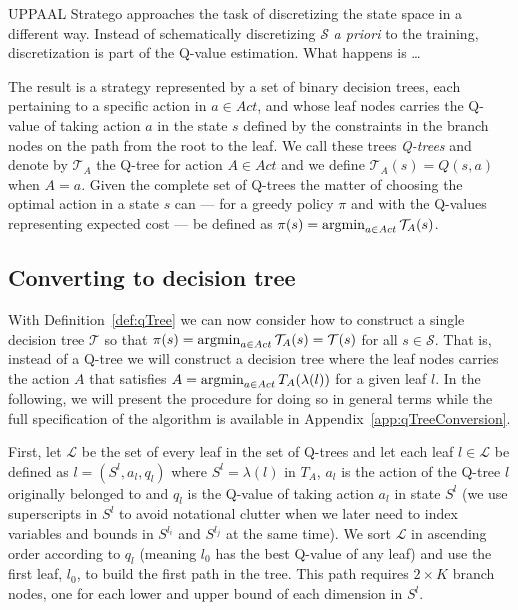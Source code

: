 UPPAAL Stratego approaches the task of discretizing the state space in a
different way. Instead of schematically discretizing $\mathcal{S}$ \textit{a
priori} to the training, discretization is part of the Q-value estimation. What
happens is \ldots{}

The result is a strategy represented by a set of binary decision trees, each
pertaining to a specific action in $a \in Act$, and whose leaf nodes carries the
Q-value of taking action $a$ in the state $s$ defined by the constraints in the
branch nodes on the path from the root to the leaf. We call these trees
\textit{Q-trees} and denote by $\mathcal{T}_A$ the Q-tree for action $A \in Act$
and we define $\mathcal{T}_A(s) = Q(s,a)$ when $A=a$. Given the complete set of Q-trees
the matter of choosing the optimal action in a state $s$ can --- for a greedy
policy $\pi$ and with the Q-values representing expected cost --- be defined as
$\pi(s) = \operatorname*{argmin}_{a\in Act} \mathcal{T}_A(s)$.


\subsection{Converting to decision tree}%
\label{subsec:convertQTtoDT}

With Definition~\ref{def:qTree} we can now consider how to construct a single
decision tree $\mathcal{T}$ so that $\pi(s) = \operatorname*{argmin}_{a \in Act}
\mathcal{T}_A(s) = \mathcal{T}(s)$ for all $s \in \mathcal{S}$. That is, instead
of a Q-tree we will construct a decision tree where the leaf nodes carries the
action $A$ that satisfies $A = \operatorname*{argmin}_{a \in Act} T_A(\lambda(l))$ for
a given leaf $l$. In the following, we will present the procedure for doing so
in general terms while the full specification of the algorithm is available in
Appendix~\ref{app:qTreeConversion}.

First, let $\mathcal{L}$ be the set of every leaf in the set of Q-trees and let
each leaf $l \in \mathcal{L}$ be defined as $l = (S^{l}, a_l, q_l)$ where $S^{l} =
\lambda(l)$ in $T_A$, $a_l$ is the action of the Q-tree $l$ originally belonged to
and $q_l$ is the Q-value of taking action $a_l$ in state $S^{l }$ (we use
superscripts in $S^l$ to avoid notational clutter when we later need to index
variables and bounds in $S^{l_i}$ and $S^{l_j}$ at the same time). We sort
$\mathcal{L}$ in ascending order according to $q_l$ (meaning $l_0$ has the best
Q-value of any leaf) and use the first leaf, $l_0$, to build the first path in
the tree. This path requires $2 \times K$ branch nodes, one for each lower and
upper bound of each dimension in  $S^{l}$.

